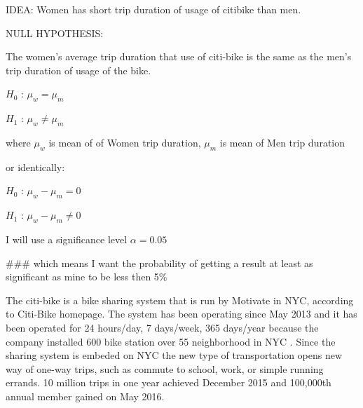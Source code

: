 IDEA:
Women has short trip duration of usage of citibike than men.

NULL HYPOTHESIS:

The women's average trip duration that use of citi-bike is the same as the men's trip duration of usage of the bike.


$H_0$ : $\mu_w  = \mu_m $ 

$H_1$ : $\mu_w  \neq \mu_m $ 

where $\mu_w$ is mean of of Women trip duration, $\mu_m$ is mean of Men trip duration

or identically:

$H_0$ : $\mu_w - \mu_m   = 0 $

$H_1$ : $\mu_w  - \mu_m   \neq 0 $

 I will use a significance level  $\alpha=0.05$

### which means I want the probability of getting a result at least as significant as mine to be less then 5\%


The citi-bike is a bike sharing system that is run by Motivate in NYC, according to Citi-Bike homepage\cite{nyc}. The system has been operating since May 2013 and it has been operated for 24 hours/day, 7 days/week, 365 days/year because the company installed 600 bike station over 55 neighborhood in NYC \cite{nyc}. Since the sharing system is embeded on NYC the new type of transportation opens new way of one-way trips, such as commute to school, work, or simple running errands. 10 million trips in one year achieved December 2015 and 100,000th annual member gained on May 2016\cite{nyc}.


